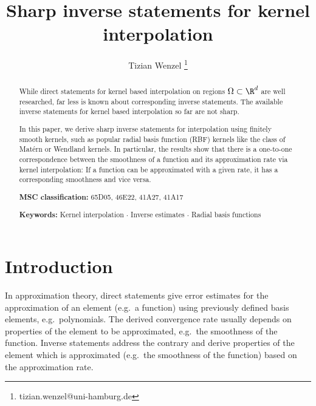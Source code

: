 \documentclass[a4paper, 10pt]{article}
\title{Sharp inverse statements for kernel interpolation}
\author[1, 2]{Tizian Wenzel \thanks{tizian.wenzel@uni-hamburg.de}}
\affil[1]{Institute for Applied Analysis and Numerical Simulation, University of Stuttgart, Germany}
\affil[2]{Department of Mathematics, Universität Hamburg, \newline Bundesstr. 55, 20146, Hamburg, Germany}
\begin{document}
\maketitle %



  
\begin{abstract}
%
%
%
%
%
%

%
While direct statements for kernel based interpolation on regions $\Omega \subset \R^d$ are well researched, 
far less is known about corresponding inverse statements.
The available inverse statements for kernel based interpolation so far are not sharp.

In this paper,
we derive sharp inverse statements for interpolation using finitely smooth kernels,
such as popular radial basis function (RBF) kernels like the class of Matérn or Wendland kernels.
In particular, the results show that there is a one-to-one correspondence between the smoothness of a function and its approximation rate via kernel interpolation: 
If a function can be approximated with a given rate, it has a corresponding smoothness and vice versa. \newline

%
%
%

%
%
\textbf{MSC classification:} 65D05, 46E22, 41A27, 41A17

%
\textbf{Keywords:} Kernel interpolation $\cdot$ Inverse estimates $\cdot$ Radial basis functions
\end{abstract}

%
%
%
%
%
%
%
%
 

%
%
%
%
%
%
%
%

%
 
%
%
%
%
%
%
%
%
%
%
%
%
%
%
%
%
%
%
%
%
%
%
%
%
%
%
%
%
%
%
%
%
%
%
%
%
%
%
%
%
%
%

%

\section{Introduction} \label{sec:introduction}

In approximation theory, direct statements give error estimates for the approximation of an element (e.g.\ a function) %
using previously defined basis elements, e.g.\ polynomials.
The derived convergence rate usually depends on properties of the element to be approximated, e.g.\ the smoothness of the function.
Inverse statements address the contrary and derive properties of the element which is approximated (e.g.\ the smoothness of the function) based on the approximation rate.
\end{document}
